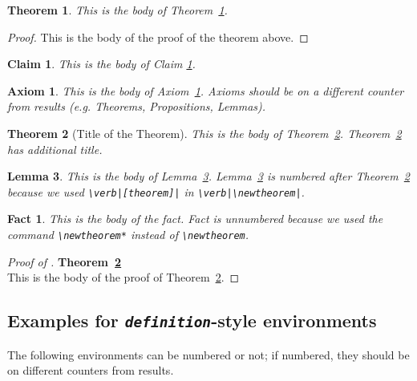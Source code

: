 \documentclass[qe,nameyear,draft]{econsocart}
\theoremstyle{plain}
\newtheorem{claim}{Claim}
\newtheorem*{fact}{Fact}
\newtheorem{theorem}{Theorem}[section]
\newtheorem{lemma}[theorem]{Lemma}
\newtheorem{axiom}{Axiom}[section]
\begin{document}
\begin{theorem}\label{th1}This is the body of Theorem~\ref{th1}.

\end{theorem}\begin{proof}This is the body of the proof of the theorem above.

\end{proof}
\begin{claim}\label{cl1}
This is the body of Claim \ref{cl1}.
\end{claim}
\begin{axiom}\label{ax1}This is the body of Axiom~\ref{ax1}. Axioms should be on a different counter from results (e.g. Theorems, Propositions, Lemmas).

\end{axiom}\begin{theorem}[Title of the Theorem]\label{th2}This is the body of Theorem~\ref{th2}. Theorem~\ref{th2} has additional title.

\end{theorem}\begin{lemma}\label{le1}This is the body of Lemma~\ref{le1}. Lemma~\ref{le1} is numbered after
Theorem~\ref{th2} because we used \texttt{{\textbackslash}verb|[theorem]|} in \texttt{{\textbackslash}verb|{\textbackslash}newtheorem|}.

\end{lemma}
\begin{fact}
This is the body of the fact. Fact is unnumbered because we used the command \verb|\newtheorem*|
instead of \verb|\newtheorem|.
\end{fact}
\begin{proof}[Proof of ]\textbf{Theorem~\ref{th2}}\\
This is the body of the proof of Theorem~\ref{th2}.

\end{proof}\subsection{Examples for \textit{\texttt{definition}}-style environments}

The following environments can be numbered or not; if numbered, they should be on different counters from results.
\end{document}
